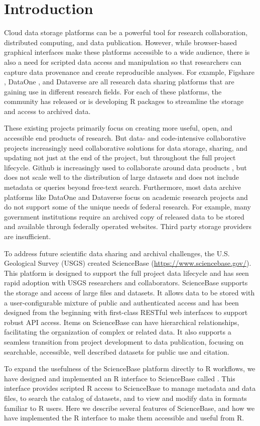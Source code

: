 \section{Introduction}

Cloud data storage platforms can be a powerful tool for research collaboration,
distributed computing, and data publication. However, while browser-based graphical
interfaces make these platforms accessible to a wide audience, there is also
a need for scripted data access and manipulation so that researchers can capture 
data provenance and create reproducible analyses. For example,
Figshare , DataOne , and Dataverse  
are all research data
sharing platforms that are gaining use in different research fields. For each of these
platforms, the community has released \citep{rfigshare, dvn} or is
developing \citep{dataone} R packages to streamline the storage and access
to archived data. 

These existing projects primarily focus on creating more useful, open, and
accessible end products of research. But data- and code-intensive collaborative projects
increasingly need collaborative solutions for data storage, sharing, and updating
not just at the end of the project, but throughout the full project lifecycle. 
Github is increasingly used to collaborate around data products \citep{GandrudGithub}, 
but does not scale well to the distribution of large datasets \citep{Delcambre2013} and does not
include metadata or queries beyond free-text search. Furthermore, 
most data archive platforms like DataOne and Dataverse 
focus on academic research projects and do not support some
of the unique needs of federal research. For example, many government institutions
require an archived copy of released data to be stored and available through federally
operated websites. Third party storage providers are insufficient.

To address future scientific data sharing and archival challenges, the U.S. 
Geological Survey (USGS) created ScienceBase (\url{https://www.sciencebase.gov/}). 
This platform is designed to support the full project data lifecycle and has seen 
rapid adoption with USGS researchers and collaborators. ScienceBase supports the 
storage and access of large files and datasets. It allows data to be stored 
with a user-configurable mixture of 
public and authenticated access and has been designed from the beginning with
first-class RESTful web interfaces to support robust API access. Items on ScienceBase 
can have hierarchical relationships, facilitating the organization of complex or related
data. It also supports a seamless transition from project development to data publication, 
focusing on searchable, accessible, well described datasets for public use and citation.

To expand the usefulness of the ScienceBase platform directly to R workflows, 
we have designed and
implemented an R interface to ScienceBase called .
This interface provides scripted R access to ScienceBase to manage metadata and
data files, to search the catalog of datasets, and to view and modify data in
formats familiar to R users.
Here we describe several features of ScienceBase, and how we have
implemented the R interface to make them accessible and useful from R.
